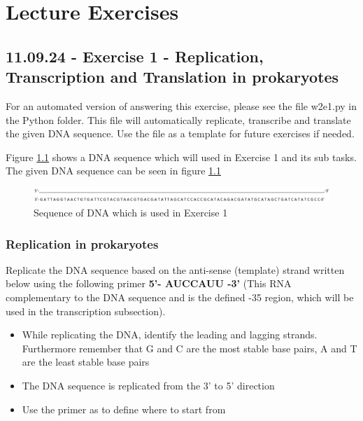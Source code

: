 \chapter{Lecture Exercises}

\section{11.09.24 - Exercise 1 - Replication, Transcription and Translation in prokaryotes}
For an automated version of answering this exercise, please see the file w2e1.py in the Python folder. This file will automatically replicate, transcribe and translate the given DNA sequence. Use the file as a template for future exercises if needed.

Figure \ref*{fig:Exercise1Seq} shows a DNA sequence which will used in Exercise 1 and its sub tasks. The given DNA sequence can be seen in figure \ref{fig:Exercise1Seq}

\begin{figure}[h]
    \centering  
    \includegraphics[width=1\textwidth]{Figures/Exercise1Seq.png}
    \caption{Sequence of DNA which is used in Exercise 1}
    \label{fig:Exercise1Seq}
\end{figure}
\subsection{Replication in prokaryotes}
Replicate the DNA sequence based on the anti-sense (template) strand written below using the following primer \textbf{5’- AUCCAUU -3’} (This RNA complementary to the DNA sequence and is the defined -35 region, which will be used in the transcription subsection).

\vspace{1em}
\begin{itemize}
    \item While replicating the DNA, identify the leading and lagging strands. Furthermore remember that G and C are the most stable base pairs, A and T are the least stable base pairs
    \item The DNA sequence is replicated from the 3’ to 5’ direction
    \item Use the primer as to define where to start from
\end{itemize} 

\vspace{1em}

